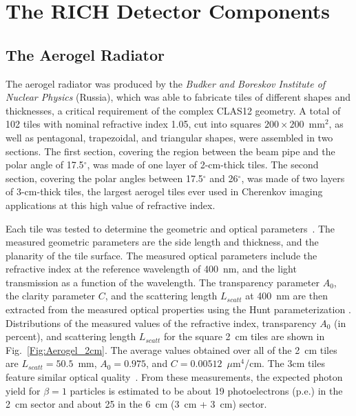 \documentclass[5p,times,twocolumn]{elsarticle}
\begin{document}

\section{The RICH Detector Components}

\subsection{The Aerogel Radiator}

The aerogel radiator was produced by the {\it Budker and Boreskov Institute of Nuclear Physics} (Russia), which was
able to fabricate tiles of different shapes and thicknesses, a critical requirement of the complex CLAS12 geometry.
A total of 102 tiles with nominal refractive index 1.05, cut into squares $200 \times 200$~mm$^2$, as well as
pentagonal, trapezoidal, and triangular shapes, were assembled in two sections. The first section, covering the region
between the beam pipe and the polar angle of 17.5$^\circ$, was made of one layer of 2-cm-thick tiles. The second
section, covering the polar angles between 17.5$^\circ$ and 26$^\circ$, was made of two layers of 3-cm-thick tiles, the
largest aerogel tiles ever used in Cherenkov imaging applications at this high value of refractive index.

Each tile was tested to determine the geometric and optical parameters~\cite{REF:RICH2016mc}. The measured
geometric parameters are the side length and thickness, and the planarity of the tile surface. The measured optical
parameters include the refractive index at the reference wavelength of 400~nm, and the light transmission as a
function of the wavelength. The transparency parameter $A_0$, the clarity parameter $C$, and the scattering length
$L_{scatt}$ at 400~nm are then extracted from the measured optical properties using the Hunt parameterization
\cite{REF:Hunt}. Distributions of the measured values of the refractive index, transparency $A_0$ (in percent), and 
scattering length $L_{scatt}$ for the
square 2~cm tiles are shown in Fig.~\ref{Fig:Aerogel_2cm}. The average values obtained over all of the 2~cm tiles are
$L_{scatt} = 50.5$~mm, $A_0 = 0.975$, and $C = 0.00512$~$\mu$m$^4$/cm. The 3cm tiles feature similar optical 
quality~\cite{REF:RICH2016mc}. From these measurements, the expected
photon yield for $\beta=1$ particles is estimated to be about 19 photoelectrons (p.e.) in the 2~cm sector and about 25
in the 6~cm (3~cm + 3~cm) sector.
\end{document}

